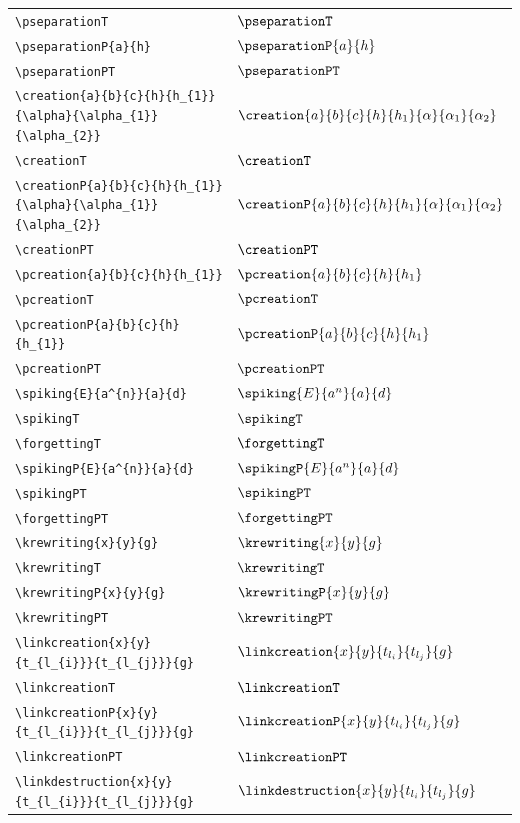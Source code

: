 \documentclass{article}
\begin{document}
{\begin{longtable}{ll}
  \verb=\pseparationT= & $\pseparationT$ \\
  \verb=\pseparationP{a}{h}= & $\pseparationP{a}{h}$ \\
  \verb=\pseparationPT= & $\pseparationPT$ \\
  \verb=\creation{a}{b}{c}{h}{h_{1}}{\alpha}{\alpha_{1}}{\alpha_{2}}= & $\creation{a}{b}{c}{h}{h_{1}}{\alpha}{\alpha_{1}}{\alpha_{2}}$ \\
  \verb=\creationT= & $\creationT$ \\
  \verb=\creationP{a}{b}{c}{h}{h_{1}}{\alpha}{\alpha_{1}}{\alpha_{2}}= & $\creationP{a}{b}{c}{h}{h_{1}}{\alpha}{\alpha_{1}}{\alpha_{2}}$ \\
  \verb=\creationPT= & $\creationPT$ \\
  \verb=\pcreation{a}{b}{c}{h}{h_{1}}= & $\pcreation{a}{b}{c}{h}{h_{1}}$ \\
  \verb=\pcreationT= & $\pcreationT$ \\
  \verb=\pcreationP{a}{b}{c}{h}{h_{1}}= & $\pcreationP{a}{b}{c}{h}{h_{1}}$ \\
  \verb=\pcreationPT= & $\pcreationPT$ \\
  \verb=\spiking{E}{a^{n}}{a}{d}= & $\spiking{E}{a^{n}}{a}{d}$ \\
  \verb=\spikingT= & $\spikingT$ \\
  \verb=\forgettingT= & $\forgettingT$ \\
  \verb=\spikingP{E}{a^{n}}{a}{d}= & $\spikingP{E}{a^{n}}{a}{d}$ \\
  \verb=\spikingPT= & $\spikingPT$ \\
  \verb=\forgettingPT= & $\forgettingPT$ \\
  \verb=\krewriting{x}{y}{g}= & $\krewriting{x}{y}{g}$ \\
  \verb=\krewritingT= & $\krewritingT$ \\
  \verb=\krewritingP{x}{y}{g}= & $\krewritingP{x}{y}{g}$ \\
  \verb=\krewritingPT= & $\krewritingPT$ \\
  \verb=\linkcreation{x}{y}{t_{l_{i}}}{t_{l_{j}}}{g}= & $\linkcreation{x}{y}{t_{l_{i}}}{t_{l_{j}}}{g}$ \\
  \verb=\linkcreationT= & $\linkcreationT$ \\
  \verb=\linkcreationP{x}{y}{t_{l_{i}}}{t_{l_{j}}}{g}= & $\linkcreationP{x}{y}{t_{l_{i}}}{t_{l_{j}}}{g}$ \\
  \verb=\linkcreationPT= & $\linkcreationPT$ \\
  \verb=\linkdestruction{x}{y}{t_{l_{i}}}{t_{l_{j}}}{g}= & $\linkdestruction{x}{y}{t_{l_{i}}}{t_{l_{j}}}{g}$ \\

\end{longtable}}
\end{document}
